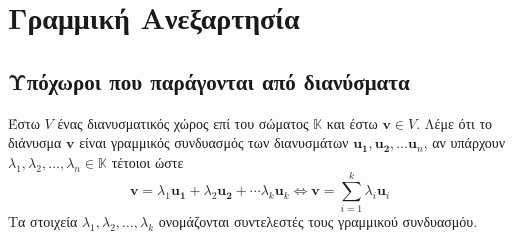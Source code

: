 



\let\vec\mathbf

\pagestyle{vangelis}




\chapter{Γραμμική Ανεξαρτησία}

\section{Υπόχωροι που παράγονται από διανύσματα}

\begin{dfn}
  Έστω $ V $ ένας διανυσματικός χώρος επί του σώματος $ \mathbb{K} $ και έστω 
  $ \mathbf{v} \in V $. Λέμε ότι το διάνυσμα $ \mathbf{v}$ είναι 
  \textcolor{Col2}{γραμμικός συνδυασμός} των διανυσμάτων 
  $ \mathbf{u_{1}}, \mathbf{u_{2}}, \ldots \mathbf{u}_{n} $, αν υπάρχουν 
  $ \lambda _{1}, \lambda _{2}, \ldots, \lambda _{n} \in \mathbb{K} $ τέτοιοι ώστε 
  \[
    \mathbf{v} = \lambda _{1} \mathbf{u_{1}}+ \lambda_{2} \mathbf{u_{2}}+ 
    \cdots \lambda _{k} \mathbf{u}_{k} \Leftrightarrow \mathbf{v} = 
    \sum_{i=1}^{k} \lambda _{i} \mathbf{u}_{i} 
  \]
  Τα στοιχεία $ \lambda _{1}, \lambda _{2}, \ldots, \lambda _{k} $ ονομάζονται 
  \textcolor{Col2}{συντελεστές} τους γραμμικού συνδυασμόυ.
\end{dfn}

